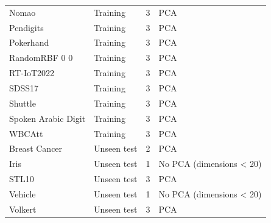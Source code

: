 \begin{scriptsize}
\begin{longtable}{p{4.1cm}p{2.2cm}r p{3.5cm}}
Nomao & Training & 3 & PCA \\
Pendigits & Training & 3 & PCA \\
Pokerhand & Training & 3 & PCA \\
RandomRBF 0 0 & Training & 3 & PCA \\
RT-IoT2022 & Training & 3 & PCA \\
SDSS17 & Training & 3 & PCA \\
Shuttle & Training & 3 & PCA \\
Spoken Arabic Digit & Training & 3 & PCA \\
WBCAtt & Training & 3 & PCA \\
Breast Cancer & Unseen test & 2 & PCA \\
Iris & Unseen test & 1 & No PCA (dimensions < 20) \\
STL10 & Unseen test & 3 & PCA \\
Vehicle & Unseen test & 1 & No PCA (dimensions < 20) \\
Volkert & Unseen test & 3 & PCA \\
\end{longtable}
\end{scriptsize}
